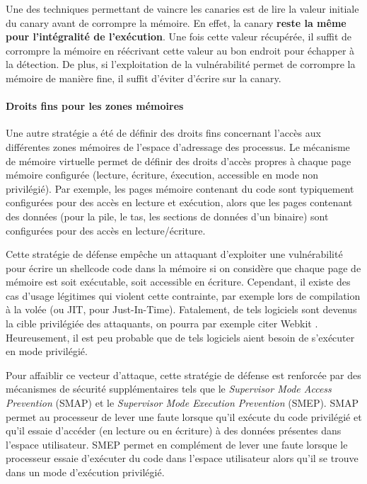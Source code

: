 Une des techniques permettant de vaincre les canaries est de lire la valeur initiale du canary avant de corrompre la mémoire. En effet, la canary \textbf{reste la même pour l'intégralité de l'exécution}. Une fois cette valeur récupérée, il suffit de corrompre la mémoire en réécrivant cette valeur au bon endroit pour échapper à la détection. De plus, si l'exploitation de la vulnérabilité permet de corrompre la mémoire de manière fine, il suffit d'éviter d'écrire sur la canary.

\paragraph{Droits fins pour les zones mémoires}
\label{memory_rights}
Une autre stratégie a été de définir des droits fins concernant l'accès aux différentes zones mémoires de l'espace d'adressage des processus. Le mécanisme de mémoire virtuelle permet de définir des droits d'accès propres à chaque page mémoire configurée (lecture, écriture, éxecution, accessible en mode non privilégié). Par exemple, les pages mémoire contenant du code sont typiquement configurées pour des accès en lecture et exécution, alors que les pages contenant des données (pour la pile, le tas, les sections de données d'un binaire) sont configurées pour des accès en lecture/écriture.

Cette stratégie de défense empêche un attaquant d'exploiter une vulnérabilité pour écrire un shellcode code dans la mémoire si on considère que chaque page de mémoire est soit exécutable, soit accessible en écriture. Cependant, il existe des cas d'usage légitimes qui violent cette contrainte, par exemple lors de compilation à la volée (ou JIT, pour Just-In-Time). Fatalement, de tels logiciels sont devenus la cible privilégiée des attaquants, on pourra par exemple citer Webkit \cite{webkitexploit}.
Heureusement, il est peu probable que de tels logiciels aient besoin de s'exécuter en mode privilégié. 

Pour affaiblir ce vecteur d'attaque, cette stratégie de défense est renforcée par des mécanismes de sécurité supplémentaires tels que le \emph{Supervisor Mode Access Prevention} (SMAP) et le \emph{Supervisor Mode Execution Prevention} (SMEP). SMAP permet au processeur de lever une faute lorsque qu'il exécute du code privilégié et qu'il essaie d'accéder (en lecture ou en écriture) à des données présentes dans l'espace utilisateur. SMEP permet en complément de lever une faute lorsque le processeur essaie d'exécuter du code dans l'espace utilisateur alors qu'il se trouve dans un mode d'exécution privilégié.

